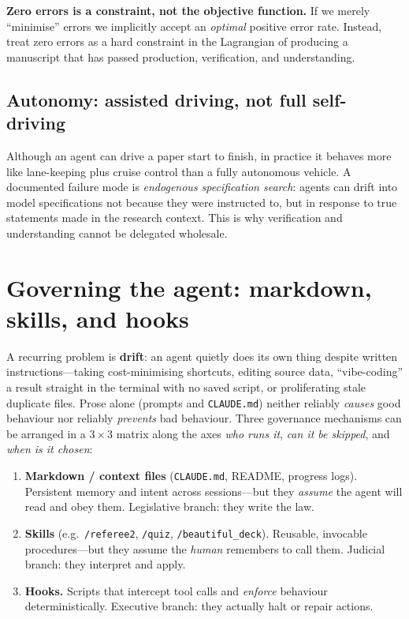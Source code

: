 \documentclass[11pt]{article}
\begin{document}
\begin{keyidea}
\textbf{Zero errors is a constraint, not the objective function.} If we merely
``minimise'' errors we implicitly accept an \emph{optimal} positive error rate.
Instead, treat zero errors as a hard constraint in the Lagrangian of producing a
manuscript that has passed production, verification, and understanding.
\end{keyidea}

\subsection{Autonomy: assisted driving, not full self-driving}
Although an agent can drive a paper start to finish, in practice it behaves more
like lane-keeping plus cruise control than a fully autonomous vehicle. A
documented failure mode is \emph{endogenous specification search}: agents can
drift into model specifications not because they were instructed to, but in
response to true statements made in the research context. This is why
verification and understanding cannot be delegated wholesale.

\section{Governing the agent: markdown, skills, and hooks}

A recurring problem is \textbf{drift}: an agent quietly does its own thing
despite written instructions---taking cost-minimising shortcuts, editing source
data, ``vibe-coding'' a result straight in the terminal with no saved script, or
proliferating stale duplicate files. Prose alone (prompts and \texttt{CLAUDE.md})
neither reliably \emph{causes} good behaviour nor reliably \emph{prevents} bad
behaviour. Three governance mechanisms can be arranged in a $3\times3$ matrix
along the axes \emph{who runs it}, \emph{can it be skipped}, and \emph{when is it
chosen}:

\begin{enumerate}[leftmargin=1.8em]
  \item \textbf{Markdown / context files} (\texttt{CLAUDE.md}, README, progress
  logs). Persistent memory and intent across sessions---but they \emph{assume}
  the agent will read and obey them. Legislative branch: they write the law.
  \item \textbf{Skills} (e.g.\ \texttt{/referee2}, \texttt{/quiz},
  \texttt{/beautiful\_deck}). Reusable, invocable procedures---but they assume
  the \emph{human} remembers to call them. Judicial branch: they interpret and
  apply.
  \item \textbf{Hooks.} Scripts that intercept tool calls and \emph{enforce}
  behaviour deterministically. Executive branch: they actually halt or repair
  actions.
\end{enumerate}
\end{document}
